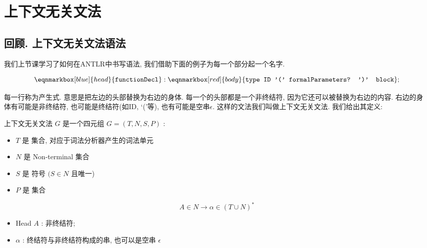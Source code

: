 \documentclass{ctexart}
\begin{document}
\section{上下文无关文法}

\subsection{回顾. 上下文无关文法语法}

我们上节课学习了如何在ANTLR中书写语法, 我们借助下面的例子为每一个部分起一个名字. 

\begin{example}
    \begin{equation*}
        \eqnmarkbox[blue]{head}{\texttt{functionDecl}} : \eqnmarkbox[red]{body}{\texttt{type ID '(' formalParameters? ')' block}};  
\end{equation*}


每一行称为产生式. 意思是把左边的头部替换为右边的身体. 每一个的头部都是一个非终结符, 因为它还可以被替换为右边的内容. 右边的身体有可能是非终结符, 也可能是终结符(如ID, `('等), 也有可能是空串$\epsilon$. 这样的文法我们叫做上下文无关文法. 我们给出其定义: 
\end{example}

\begin{definition}
    上下文无关文法 $G$ 是一个四元组 $G=(T, N, S, P)$ :
    \begin{itemize}
        \item  $T$ 是 集合, 对应于词法分析器产生的词法单元
        \item $N$ 是 {Non-terminal} 集合
        \item $S$ 是 符号 $(S \in N$ 且唯一)
        \item $P$ 是 集合
    \end{itemize}
    $$
A \in N \longrightarrow \alpha \in(T \cup N)^*
$$
\begin{itemize}
    \item {} {Head} $A$ : 非终结符; 
    \item {}  $\alpha$ : 终结符与非终结符构成的串, 也可以是空串 $\epsilon$
\end{itemize}
\end{definition}
\end{document}
